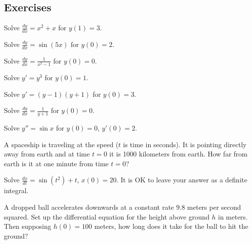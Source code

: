 \subsection{Exercises}

\begin{exercise}
Solve $\frac{dy}{dx} = x^2+x$ for $y(1)=3$.
\end{exercise}

\begin{exercise}
Solve $\frac{dy}{dx} = \sin (5x)$ for $y(0)=2$.
\end{exercise}

\begin{exercise}
Solve $\frac{dy}{dx} = \frac{1}{x^2-1}$ for $y(0)=0$.
\end{exercise}

\begin{exercise}
Solve $y' = y^3$ for $y(0)=1$.
\end{exercise}

\begin{exercise}
Solve $y' = (y-1)(y+1)$ for $y(0)=3$.
\end{exercise}

\begin{exercise}
Solve $\frac{dy}{dx} = \frac{1}{y+1}$ for $y(0)=0$.
\end{exercise}

\begin{exercise}[harder]
Solve $y'' = \sin x$ for $y(0)=0$, $y'(0) = 2$.
\end{exercise}

\begin{exercise}
A spaceship is traveling at the speed  ($t$ is
time in seconds).  It is pointing directly away from earth and at time $t=0$
it is 1000 kilometers from earth.  How far from earth is it at one minute from
time $t=0$?
\end{exercise}

\begin{exercise}
Solve $\frac{dx}{dt} = \sin(t^2)+t$, $x(0)=20$.  It is OK to leave your
answer as a definite integral.
\end{exercise}

\begin{exercise}
A dropped ball accelerates downwards at a constant rate $9.8$ meters per second
squared.  Set up the differential equation for the height above ground $h$ in meters.
Then supposing $h(0) = 100$ meters, how long does it take for the ball to hit
the ground?
\end{exercise}

